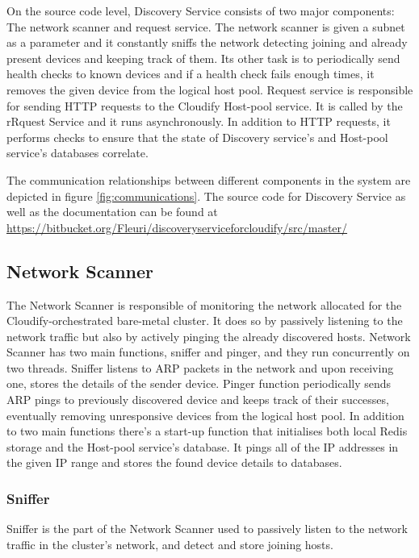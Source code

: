 On the source code level, Discovery Service consists of two major components: The network scanner and request service. The network scanner is given a subnet as a parameter and it constantly sniffs the network detecting joining and already present devices and keeping track of them. Its other task is to periodically send health checks to known devices and if a health check fails enough times, it removes the given device from the logical host pool. Request service is responsible for sending HTTP requests to the Cloudify Host-pool service. It is called by the rRquest Service and it runs asynchronously. In addition to HTTP requests, it performs checks to ensure that the state of Discovery service's and Host-pool service's databases correlate.

The communication relationships between different components in the system are depicted in figure \ref{fig:communications}. The source code for Discovery Service as well as the documentation can be found at \url{https://bitbucket.org/Fleuri/discoveryserviceforcloudify/src/master/}

\subsection{Network Scanner}

The Network Scanner is responsible of monitoring the network allocated for the Cloudify-orchestrated bare-metal cluster. It does so by passively listening to the network traffic but also by actively pinging the already discovered hosts. Network Scanner has two main functions, sniffer and pinger, and they run concurrently on two threads. Sniffer listens to ARP packets in the network and upon receiving one, stores the details of the sender device. Pinger function periodically sends ARP pings to previously discovered device and keeps track of their successes, eventually removing unresponsive devices from the logical host pool. In addition to two main functions there's a start-up function that initialises both local Redis storage and the Host-pool service's database. It pings all of the IP addresses in the given IP range and stores the found device details to databases.

\subsubsection{Sniffer}

Sniffer is the part of the Network Scanner used to passively listen to the network traffic in the cluster's network, and detect and store joining hosts. 

